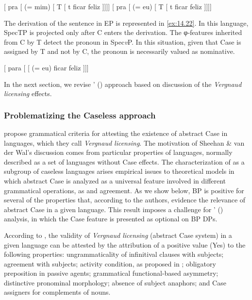 \documentclass[output=paper]{langsci/langscibook}
\begin{document}
\ea%
    \label{ex:14.21}
    \ea     {}[ pra [ \Fsg{} (= mim) [ T [ t ficar feliz ]]]]
    \ex     {}[ pra [ \Fsg{} (= eu) [ T [ t ficar feliz ]]]]
    \z
\z

The derivation of the sentence in \gls{EP} is represented in \eqref{ex:14.22}.
In this language, SpecTP is projected only after C enters the derivation. The
φ-features inherited from C by T detect the pronoun in Spec\emph{v}P. In this
situation, given that Case is assigned by T and not by C, the pronoun is
necessarily valued as nominative.

\ea\label{ex:14.22}
    {}[ para [ [ \Fsg{} (= eu) ficar  feliz ]]]
\z

In the next section, we revise \citeauthor{AvelarGalves2011}'
(\citeyear{AvelarGalves2011,AvelarGalves2016}) approach based on
 discussion of the \emph{Vergnaud licensing}
effects.

\subsubsection{Problematizing the Caseless approach}\label{sec:14.4.2.2}

\textcite{SheevanderWal2018} propose grammatical criteria for attesting the
existence of abstract Case in languages, which they call \emph{Vergnaud
licensing}. The motivation of Sheehan \& van der Wal’s discussion comes from
particular properties of  languages, normally described as a set of
languages without Case effects. The characterization of  as a subgroup of
caseless languages arises empirical issues to theoretical models in which
abstract Case is analyzed as a universal feature involved in different
grammatical operations, as  and agreement. As we show below, \gls{BP}
is positive for several of the properties that, according to the authors,
evidence the relevance of abstract Case in a given language. This result
imposes a challenge for \citeauthor{AvelarGalves2011}'
(\citeyear{AvelarGalves2011,AvelarGalves2016}) analysis,
in which the Case feature is presented as optional on \gls{BP} DPs.

According to \textcite{SheevanderWal2018}, the validity of \emph{Vergnaud
licensing} (abstract Case system) in a given language can be attested by the
attribution of a positive value (Yes) to the following properties:
ungrammaticality of infinitival clauses with subjects; agreement with subjects;
activity condition, as proposed in \textcite{Chomsky2000,Chomsky2001};
obligatory preposition in passive agents; grammatical functional-based
asymmetry; distinctive pronominal morphology; absence of subject anaphors; and
Case assigners for complements of nouns.
\end{document}
